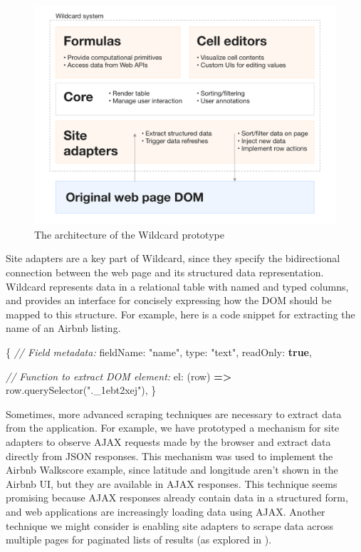\documentclass[english]{programming}
\newenvironment{Shaded}{}{}
\newcommand{\CommentTok}[1]{\textcolor[rgb]{0.38,0.63,0.69}{\textit{#1}}}
\newcommand{\FunctionTok}[1]{\textcolor[rgb]{0.02,0.16,0.49}{#1}}
\newcommand{\KeywordTok}[1]{\textcolor[rgb]{0.00,0.44,0.13}{\textbf{#1}}}
\newcommand{\NormalTok}[1]{#1}
\newcommand{\OperatorTok}[1]{\textcolor[rgb]{0.40,0.40,0.40}{#1}}
\newcommand{\StringTok}[1]{\textcolor[rgb]{0.25,0.44,0.63}{#1}}
\newcommand{\VariableTok}[1]{\textcolor[rgb]{0.10,0.09,0.49}{#1}}
\begin{document}
\begin{figure}
\hypertarget{fig:architecture}{%
\centering
\includegraphics{media/architecture-300dpi.png}
\caption{The architecture of the Wildcard
prototype}\label{fig:architecture}
}
\end{figure}

Site adapters are a key part of Wildcard, since they specify the
bidirectional connection between the web page and its structured data
representation. Wildcard represents data in a relational table with
named and typed columns, and provides an interface for concisely
expressing how the DOM should be mapped to this structure. For example,
here is a code snippet for extracting the name of an Airbnb listing.

\begin{Shaded}
\begin{Highlighting}[]
\OperatorTok{\{}
  \CommentTok{// Field metadata:}
\NormalTok{  fieldName}\OperatorTok{:} \StringTok{"name"}\OperatorTok{,}
\NormalTok{  type}\OperatorTok{:} \StringTok{"text"}\OperatorTok{,}
\NormalTok{  readOnly}\OperatorTok{:} \KeywordTok{true}\OperatorTok{,}

  \CommentTok{// Function to extract DOM element:}
\NormalTok{  el}\OperatorTok{:}\NormalTok{ (row) }\KeywordTok{=>} \VariableTok{row}\OperatorTok{.}\FunctionTok{querySelector}\NormalTok{(}\StringTok{".\_1ebt2xej"}\NormalTok{)}\OperatorTok{,}
\OperatorTok{\}}
\end{Highlighting}
\end{Shaded}

Sometimes, more advanced scraping techniques are necessary to extract
data from the application. For example, we have prototyped a mechanism
for site adapters to observe AJAX requests made by the browser and
extract data directly from JSON responses. This mechanism was used to
implement the Airbnb Walkscore example, since latitude and longitude
aren't shown in the Airbnb UI, but they are available in AJAX responses.
This technique seems promising because AJAX responses already contain
data in a structured form, and web applications are increasingly loading
data using AJAX. Another technique we might consider is enabling site
adapters to scrape data across multiple pages for paginated lists of
results (as explored in \autocite{huynh2006}).
\end{document}
